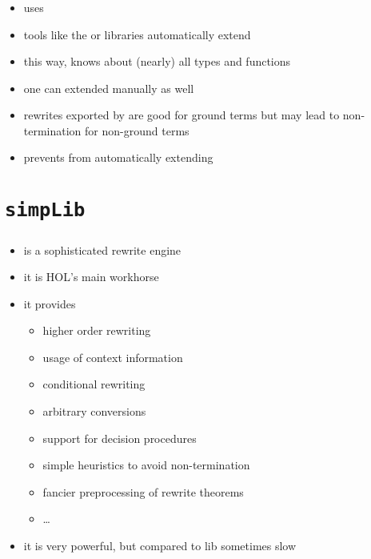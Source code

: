 \begin{frame}
\frametitle{}

\begin{itemize}
\item {} uses 
\item tools like the  or  libraries automatically extend 
\item this way,  knows about (nearly) all types and functions
\item one can extended  manually as well
\item rewrites exported by  are good for ground terms but may lead to non-termination for non-ground terms
\item {} prevents  from automatically extending 
\end{itemize}
\end{frame}


\section{\texttt{simpLib}}

\begin{frame}
\frametitle{}

\begin{itemize}
\item {} is a sophisticated rewrite engine
\item it is HOL's main workhorse
\item it provides
\begin{itemize}
\item higher order rewriting
\item usage of context information
\item conditional rewriting
\item arbitrary conversions
\item support for decision procedures
\item simple heuristics to avoid non-termination
\item fancier preprocessing of rewrite theorems
\item \ldots
\end{itemize}
\item it is very powerful, but compared to  lib sometimes slow
\end{itemize}
\end{frame}


